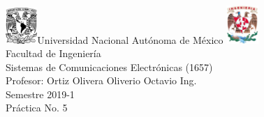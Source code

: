 

\begin{titlepage}
     \begin{center}
	\includegraphics[width=0.09\textwidth]{Imagenes/UNAM}\Large Universidad Nacional Autónoma de México
        	\includegraphics[width=0.09\textwidth]{Imagenes/FI}\\[1cm]
        \Large Facultad de Ingeniería\\[1cm]
         \Large Sistemas de Comunicaciones Electrónicas (1657)\\[1cm]
         \footnotesize Profesor: Ortiz Olivera Oliverio Octavio Ing.\\[1cm]
        \footnotesize Semestre 2019-1\\[1cm]
        
        
      
        \Large Práctica No. 5\\[1cm]
        
        

\end{center}
\end{titlepage}
